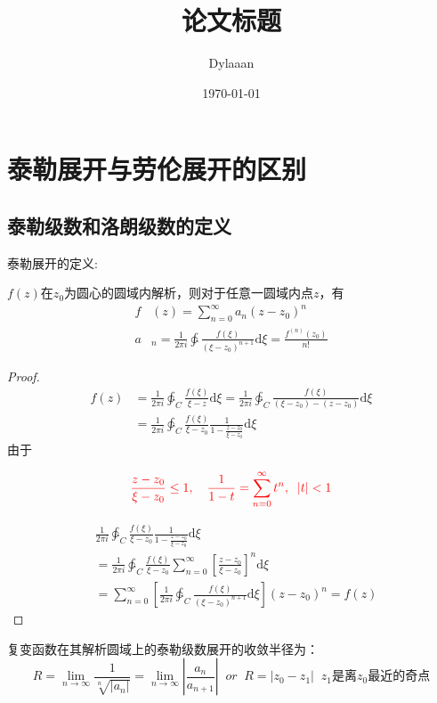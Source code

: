 \documentclass[12pt, a4paper, oneside]{ctexart}
\title{\textbf{论文标题}}
\author{Dylaaan}
\date{\today}
\def\D{\mathrm{d}}
\newcommand{\F}[1][z]
{\ensuremath{f(#1)}}
\begin{document}
\maketitle

\setcounter{page}{0}
\maketitle
\thispagestyle{empty}

\newpage
{}
\setcounter{page}{1}
\tableofcontents
\newpage
\setcounter{page}{1}

\section{泰勒展开与劳伦展开的区别}

\subsection{泰勒级数和洛朗级数的定义}

泰勒展开的定义:

$\F$在$z_0$为圆心的圆域内解析，则对于任意一圆域内点$z$，有
\begin{align*}
    f & (z)=\sum_{n=0}^\infty a_n(z-z_0)^n                                                                 \\
    a & _n=\frac{1}{2\pi i}\ointctrclockwise \frac{\F[\xi]}{(\xi-z_0)^{n+1}}\D \xi=\frac{f^{(n)}(z_0)}{n!}
\end{align*}
\begin{proof}
    \begin{align*}
        \F & =\frac{1}{2\pi i}\ointctrclockwise_C \frac{\F[\xi]}{\xi-z}\D \xi=\frac{1}{2\pi i}\ointctrclockwise_C \frac{\F[\xi]}{(\xi-z_0)-(z-z_0)}\D \xi \\
           & =\frac{1}{2\pi i}\ointctrclockwise_C \frac{\F[\xi]}{\xi-z_0}\frac{1}{1-\frac{z-z_0}{\xi-z_0}}\D \xi
    \end{align*}
    由于


    \begin{equation}
        \label{spanseries}
        \color{red}
        \frac{z-z_0}{\xi-z_0}\le 1,\quad\frac{1}{1-t}=\sum_{n=0}^\infty t^n,\;\; |t|<1
    \end{equation}

    \begin{align*}
         & \frac{1}{2\pi i}\ointctrclockwise_C \frac{\F[\xi]}{\xi-z_0}\frac{1}{1-\frac{z-z_0}{\xi-z_0}}\D \xi                       \\
         & =\frac{1}{2\pi i}\ointctrclockwise_C \frac{\F[\xi]}{\xi-z_0}\sum_{n=0}^\infty \left[\frac{z-z_0}{\xi-z_0}\right]^n\D \xi \\
         & =\sum_{n=0}^\infty \left[\frac{1}{2\pi i}\ointctrclockwise_C \frac{\F[\xi]}{(\xi-z_0)^{n+1}}\D \xi\right](z-z_0)^n=\F
    \end{align*}
\end{proof}
复变函数在其解析圆域上的泰勒级数展开的收敛半径为：
$$
    R=\lim_{n\to \infty}\frac{1}{\sqrt[n]{|a_n|}}=\lim_{n\to \infty} \left| \frac{a_n}{a_{n+1}} \right| \;\; or \;\; R=|z_0-z_1| \;\; \text{$z_1$是离$z_0$最近的奇点}
$$
\end{document}
